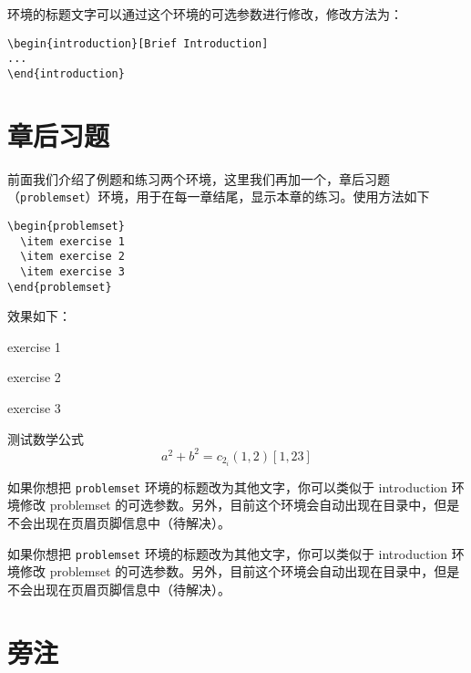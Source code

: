 \documentclass[lang=cn,newtx,10pt,scheme=chinese,color=black]{elegantbook}
\begin{document}
环境的标题文字可以通过这个环境的可选参数进行修改，修改方法为：
\begin{lstlisting}
\begin{introduction}[Brief Introduction]
...
\end{introduction}
\end{lstlisting}

\section{章后习题}
前面我们介绍了例题和练习两个环境，这里我们再加一个，章后习题（\lstinline{problemset}）环境，用于在每一章结尾，显示本章的练习。使用方法如下

\begin{lstlisting}
\begin{problemset}
  \item exercise 1
  \item exercise 2
  \item exercise 3
\end{problemset}
\end{lstlisting}


效果如下：
\begin{problemset}[我的题目]
  \item exercise 1
  \item exercise 2
  \item exercise 3
  \item 测试数学公式
  \begin{equation}
    a^2+b^2=c_{2_{i}} (1,2) [1,23]
  \end{equation}
\end{problemset}

\begin{remark}
如果你想把 \lstinline{problemset} 环境的标题改为其他文字，你可以类似于 introduction 环境修改 problemset 的可选参数。另外，目前这个环境会自动出现在目录中，但是不会出现在页眉页脚信息中（待解决）。
\end{remark}

\begin{solution}
如果你想把 \lstinline{problemset} 环境的标题改为其他文字，你可以类似于 introduction 环境修改 problemset 的可选参数。另外，目前这个环境会自动出现在目录中，但是不会出现在页眉页脚信息中（待解决）。
\end{solution}

\section{旁注}
\end{document}

